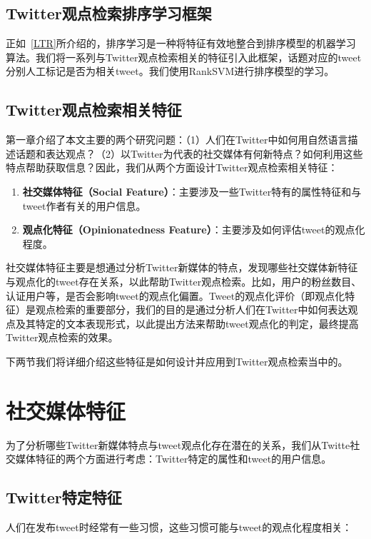  \subsection{Twitter观点检索排序学习框架}
 正如~\ref{LTR}所介绍的，排序学习是一种将特征有效地整合到排序模型的机器学习算法。我们将一系列与Twitter观点检索相关的特征引入此框架，话题对应的tweet分别人工标记是否为相关tweet。我们使用RankSVM进行排序模型的学习。

 \subsection{Twitter观点检索相关特征}
第一章介绍了本文主要的两个研究问题：（1）人们在Twitter中如何用自然语言描述话题和表达观点？（2）以Twitter为代表的社交媒体有何新特点？如何利用这些特点帮助获取信息？因此，我们从两个方面设计Twitter观点检索相关特征：
  \begin{enumerate}
\item{\textbf{社交媒体特征（Social Feature）}}：主要涉及一些Twitter特有的属性特征和与tweet作者有关的用户信息。
\item{\textbf{观点化特征（Opinionatedness Feature）}}：主要涉及如何评估tweet的观点化程度。
\end{enumerate}

社交媒体特征主要是想通过分析Twitter新媒体的特点，发现哪些社交媒体新特征与观点化的tweet存在关系，以此帮助Twitter观点检索。比如，用户的粉丝数目、认证用户等，是否会影响tweet的观点化偏置。Tweet的观点化评价（即观点化特征）是观点检索的重要部分，我们的目的是通过分析人们在Twitter中如何表达观点及其特定的文本表现形式，以此提出方法来帮助tweet观点化的判定，最终提高Twitter观点检索的效果。

下两节我们将详细介绍这些特征是如何设计并应用到Twitter观点检索当中的。

\section{社交媒体特征}

为了分析哪些Twitter新媒体特点与tweet观点化存在潜在的关系，我们从Twitte社交媒体特征的两个方面进行考虑：Twitter特定的属性和tweet的用户信息。

\subsection{Twitter特定特征}
人们在发布tweet时经常有一些习惯，这些习惯可能与tweet的观点化程度相关：


